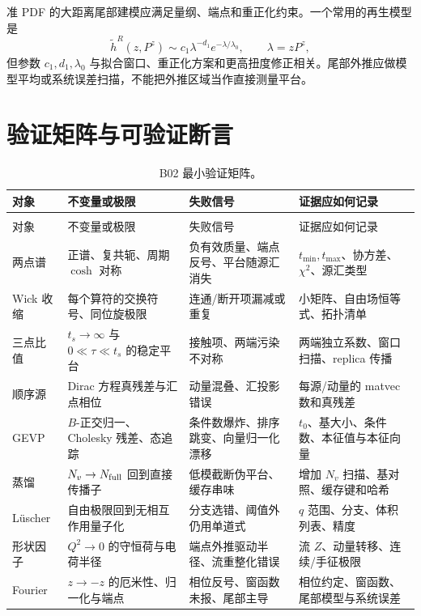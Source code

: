 准 PDF 的大距离尾部建模应满足量纲、端点和重正化约束。一个常用的再生模型是
\begin{equation}
  \widetilde h^R(z,P^z)
  \sim c_1\lambda^{-d_1}e^{-\lambda/\lambda_0},
  \qquad
  \lambda=zP^z,
  \label{eq:b02-tail-model}
\end{equation}
但参数 \(c_1,d_1,\lambda_0\) 与拟合窗口、重正化方案和更高扭度修正相关。尾部外推应做模型平均或系统误差扫描，不能把外推区域当作直接测量平台。

\section{验证矩阵与可验证断言}\label{subsec:b02-validation}

\begin{longtable}{>{\raggedright\arraybackslash}p{2.5cm}>{\raggedright\arraybackslash}p{3.8cm}>{\raggedright\arraybackslash}p{3.8cm}>{\raggedright\arraybackslash}p{3.1cm}}
\caption{B02 最小验证矩阵。}\label{tab:b02-validation-matrix}\\
\toprule
对象 & 不变量或极限 & 失败信号 & 证据应如何记录 \\
\midrule
\endfirsthead
\multicolumn{4}{l}{\small 续表：B02 最小验证矩阵。}\\
\toprule
对象 & 不变量或极限 & 失败信号 & 证据应如何记录 \\
\midrule
\endhead
\bottomrule
\endfoot
两点谱 & 正谱、复共轭、周期 \(\cosh\) 对称 & 负有效质量、端点反号、平台随源汇消失 & \(t_{\min},t_{\max}\)、协方差、\(\chi^2\)、源汇类型 \\
Wick 收缩 & 每个算符的交换符号、同位旋极限 & 连通/断开项漏减或重复 & 小矩阵、自由场恒等式、拓扑清单 \\
三点比值 & \(t_s\to\infty\) 与 \(0\ll\tau\ll t_s\) 的稳定平台 & 接触项、两端污染不对称 & 两端独立系数、窗口扫描、replica 传播 \\
顺序源 & Dirac 方程真残差与汇点相位 & 动量混叠、汇投影错误 & 每源/动量的 matvec 数和真残差 \\
GEVP & \(B\)-正交归一、Cholesky 残差、态追踪 & 条件数爆炸、排序跳变、向量归一化漂移 & \(t_0\)、基大小、条件数、本征值与本征向量 \\
蒸馏 & \(N_v\to N_{\rm full}\) 回到直接传播子 & 低模截断伪平台、缓存串味 & 增加 \(N_v\) 扫描、基对照、缓存键和哈希 \\
Lüscher & 自由极限回到无相互作用量子化 & 分支选错、阈值外仍用单道式 & \(q\) 范围、分支、体积列表、精度 \\
形状因子 & \(Q^2\to0\) 的守恒荷与电荷半径 & 端点外推驱动半径、流重整化错误 & 流 \(Z\)、动量转移、连续/手征极限 \\
Fourier & \(z\to-z\) 的厄米性、归一化与端点 & 相位反号、窗函数未报、尾部主导 & 相位约定、窗函数、尾部模型与系统误差 \\
\end{longtable}

